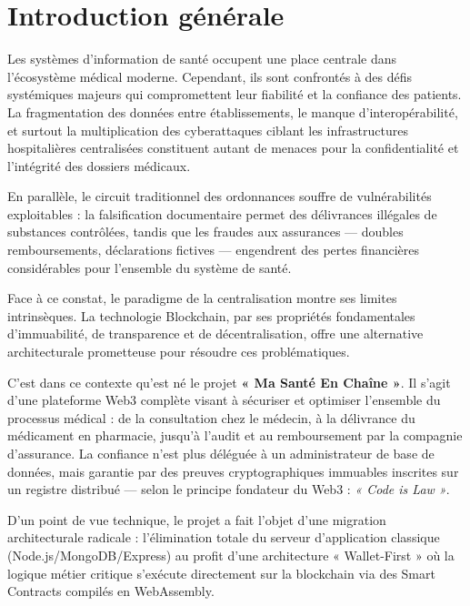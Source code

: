 \documentclass[12pt,a4paper]{report}
\begin{document}
\tableofcontents
\listoffigures
\listoftables

\chapter*{Introduction générale}

Les systèmes d'information de santé occupent une place centrale dans l'écosystème médical moderne. Cependant, ils sont confrontés à des défis systémiques majeurs qui compromettent leur fiabilité et la confiance des patients. La fragmentation des données entre établissements, le manque d'interopérabilité, et surtout la multiplication des cyberattaques ciblant les infrastructures hospitalières centralisées constituent autant de menaces pour la confidentialité et l'intégrité des dossiers médicaux.

En parallèle, le circuit traditionnel des ordonnances souffre de vulnérabilités exploitables : la falsification documentaire permet des délivrances illégales de substances contrôlées, tandis que les fraudes aux assurances — doubles remboursements, déclarations fictives — engendrent des pertes financières considérables pour l'ensemble du système de santé.

Face à ce constat, le paradigme de la centralisation montre ses limites intrinsèques. La technologie Blockchain, par ses propriétés fondamentales d'immuabilité, de transparence et de décentralisation, offre une alternative architecturale prometteuse pour résoudre ces problématiques.

C'est dans ce contexte qu'est né le projet \textbf{« Ma Santé En Chaîne »}. Il s'agit d'une plateforme Web3 complète visant à sécuriser et optimiser l'ensemble du processus médical : de la consultation chez le médecin, à la délivrance du médicament en pharmacie, jusqu'à l'audit et au remboursement par la compagnie d'assurance. La confiance n'est plus déléguée à un administrateur de base de données, mais garantie par des preuves cryptographiques immuables inscrites sur un registre distribué — selon le principe fondateur du Web3 : \textit{« Code is Law »}.

D'un point de vue technique, le projet a fait l'objet d'une migration architecturale radicale : l'élimination totale du serveur d'application classique (Node.js/MongoDB/Express) au profit d'une architecture « Wallet-First » où la logique métier critique s'exécute directement sur la blockchain via des Smart Contracts compilés en WebAssembly.
\end{document}
